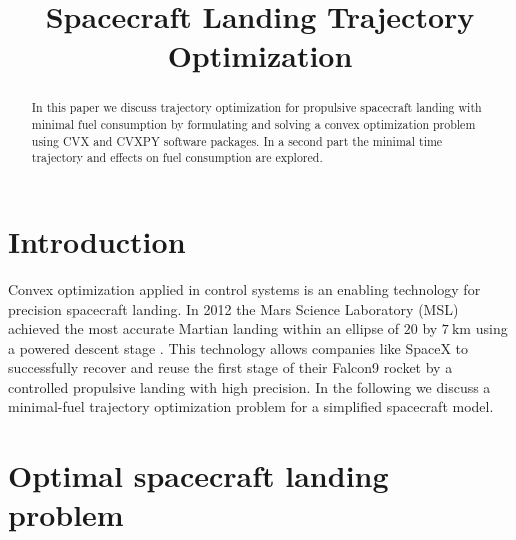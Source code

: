 \documentclass[12pt, letterpaper]{article}
\begin{document}
\title{Spacecraft Landing Trajectory Optimization}
\maketitle

\begin{table}[h]
\centering
{}
\end{table}

\begin{abstract}

In this paper we discuss trajectory optimization for propulsive spacecraft landing with minimal fuel consumption by formulating and solving a convex optimization problem using CVX and CVXPY software packages.
In a second part the minimal time trajectory and effects on fuel consumption are explored.

\end{abstract}

\section{Introduction}

Convex optimization applied in control systems is an enabling technology for precision spacecraft landing.
In 2012 the Mars Science Laboratory (MSL) achieved the most accurate Martian landing within an ellipse of $20$ by $\SI{7}{\kilo\meter}$ using a powered descent stage \cite{bib:MSL}.
This technology allows companies like SpaceX to successfully recover and reuse the first stage of their Falcon9 rocket by a controlled propulsive landing with high precision.
In the following we discuss a minimal-fuel trajectory optimization problem for a simplified spacecraft model.

\section{Optimal spacecraft landing problem}
\end{document}
